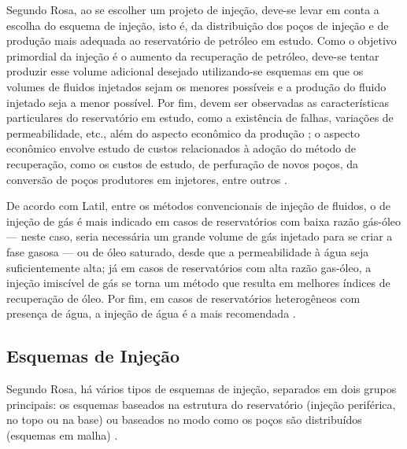 Segundo Rosa, ao se escolher um projeto de inje\c{c}\~{a}o, deve-se levar em conta a escolha do esquema de inje\c{c}\~{a}o, isto \'{e}, da distribui\c{c}\~{a}o dos po\c{c}os de inje\c{c}\~{a}o e de produ\c{c}\~{a}o mais adequada ao reservat\'{o}rio de petr\'{o}leo em estudo. Como o objetivo primordial da inje\c{c}\~{a}o \'{e} o aumento da recupera\c{c}\~{a}o de petr\'{o}leo, deve-se tentar produzir esse volume adicional desejado utilizando-se esquemas em que os volumes de fluidos injetados sejam os menores poss\'{i}veis e a produ\c{c}\~{a}o do fluido injetado seja a menor poss\'{i}vel. Por fim, devem ser observadas as caracter\'{i}sticas particulares do reservat\'{o}rio em estudo, como a exist\^{e}ncia de falhas, varia\c{c}\~{o}es de permeabilidade, etc., al\'{e}m do aspecto econ\^{o}mico da produ\c{c}\~{a}o \cite[p. 564]{engres}; o aspecto econ\^{o}mico envolve estudo de custos relacionados \`{a} ado\c{c}\~{a}o do m\'{e}todo de recupera\c{c}\~{a}o, como os custos de estudo, de perfura\c{c}\~{a}o de novos po\c{c}os, da convers\~{a}o de po\c{c}os produtores em injetores, entre outros \cite{latil}.

De acordo com Latil, entre os m\'{e}todos convencionais de inje\c{c}\~{a}o de fluidos, o de inje\c{c}\~{a}o de g\'{a}s \'{e} mais indicado em casos de reservat\'{o}rios com baixa raz\~{a}o g\'{a}s-\'{o}leo --- neste caso, seria necess\'{a}ria um grande volume de g\'{a}s injetado para se criar a fase gasosa --- ou de \'{o}leo saturado, desde que a permeabilidade \`{a} \'{a}gua seja suficientemente alta; j\'{a} em casos de reservat\'{o}rios com alta raz\~{a}o gas-\'{o}leo, a inje\c{c}\~{a}o imisc\'{i}vel de g\'{a}s se torna um m\'{e}todo que resulta em melhores \'{i}ndices de recupera\c{c}\~{a}o de \'{o}leo. Por fim, em casos de reservat\'{o}rios heterog\^{e}neos com presen\c{c}a de \'{a}gua, a inje\c{c}\~{a}o de \'{a}gua \'{e} a mais recomendada \cite{latil}. 

\subsection{Esquemas de Inje\c{c}\~{a}o}
Segundo Rosa, h\'{a} v\'{a}rios tipos de esquemas de inje\c{c}\~{a}o, separados em dois grupos principais: os esquemas baseados na estrutura do reservat\'{o}rio (inje\c{c}\~{a}o perif\'{e}rica, no topo ou na base) ou baseados no modo como os po\c{c}os s\~{a}o distribu\'{i}dos (esquemas em malha) \cite[p. 564]{engres}.


